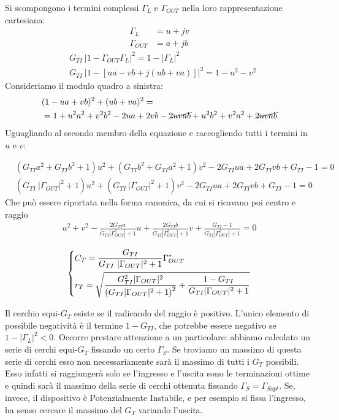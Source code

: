 Si scompongono i termini complessi $\Gamma_L$ e $\Gamma_{OUT}$ nella loro rappresentazione cartesiana:
\begin{align*}
\Gamma_L &= u + jv\\
\Gamma_{OUT} &= a + jb
\end{align*}
\begin{align*}
& G_{TI}~|1-\Gamma_{OUT} \Gamma_L|^2 =
1-|\Gamma_L|^2
\\
& G_{TI}~|1-\left[ua - vb + j(ub + va) \right]|^2 = 
1 - u^2 - v^2
\end{align*}
Consideriamo il modulo quadro a sinistra:
\begin{align*}
& (1-ua+vb)^2 + (ub+va)^2 =\\
&= 1 + u^2a^2 + v^2b^2 -2ua + 2vb - \cancel{2uvab}
+ u^2b^2 + v^2a^2 + \cancel{2 uvab}
\end{align*}
Uguagliando al secondo membro della equazione e raccogliendo tutti i termini in $u$ e $v$:

\begin{align*}
&(G_{TI}a^2 + G_{TI}b^2 +1)u^2
+ (G_{TI}b^2 + G_{TI}a^2 + 1)v^2
- 2G_{TI}ua + 2G_{TI}vb + G_{TI} -1 = 0\\
&(G_{TI}~|\Gamma_{OUT}|^2 +1)u^2
+ (G_{TI}~|\Gamma_{OUT}|^2 + 1)v^2
- 2G_{TI}ua + 2G_{TI}vb + G_{TI} -1 = 0
\end{align*}
Che può essere riportata nella forma canonica, da cui si ricavano poi centro e raggio
\begin{align*}
u^2 + v^2 -
\frac{2 G_{TI}a}{G_{TI} |\Gamma_{OUT}^2|+1} u+
\frac{2 G_{TI}b}{G_{TI} |\Gamma_{OUT}^2|+1} v
+ \frac{G_{TI} -1}{G_{TI} |\Gamma_{OUT}^2|+1} = 0
\end{align*}

\[
\begin{dcases}
C_T = \frac{G_{TI}}{G_{TI}~|\Gamma_{OUT}|^2 + 1}\Gamma_{OUT}^*\\
r_T = \sqrt{
	\frac{G_{TI}^2 |\Gamma_{OUT}|^2}{\left(G_{TI}|\Gamma_{OUT}|^2 +1\right) ^2} + 
	\frac{1 - G_{TI}}{G_{TI}|\Gamma_{OUT}|^2 +1}
}		
\end{dcases}
\]


Il cerchio equi-$G_T$ esiste se il radicando del raggio è positivo. L'unico elemento di possibile negatività è il termine $1-G_{TI}$, che potrebbe essere negativo se $1-|\Gamma_L|^2 < 0$.
%	
%	
Occorre prestare attenzione a un particolare: abbiamo calcolato un serie di cerchi equi-$G_T$ fissando un certo $\Gamma_{S}$. Se troviamo un massimo di questa serie di cerchi esso non necessariamente sarà il massimo di tutti i $G_T$ possibili. Esso infatti si raggiungerà solo se l'ingresso e l'uscita sono le terminazioni ottime e quindi sarà il massimo della serie di cerchi ottenuta fissando $\Gamma_{S} = \Gamma_{Sopt}$. Se, invece, il dispositivo è Potenzialmente Instabile, e per esempio si fissa l'ingresso, ha senso cercare il massimo del $G_T$ variando l'uscita.


